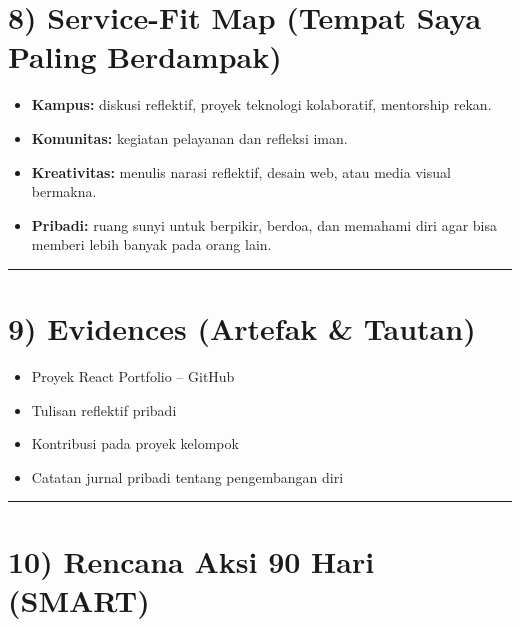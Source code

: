 \documentclass[
  letterpaper,
  DIV=11,
  numbers=noendperiod]{scrreprt}
\providecommand{\tightlist}{%
  \setlength{\itemsep}{0pt}\setlength{\parskip}{0pt}}
\begin{document}
\section{8) Service-Fit Map (Tempat Saya Paling
Berdampak)}\label{service-fit-map-tempat-saya-paling-berdampak}

\begin{itemize}
\tightlist
\item
  \textbf{Kampus:} diskusi reflektif, proyek teknologi kolaboratif,
  mentorship rekan.\\
\item
  \textbf{Komunitas:} kegiatan pelayanan dan refleksi iman.\\
\item
  \textbf{Kreativitas:} menulis narasi reflektif, desain web, atau media
  visual bermakna.\\
\item
  \textbf{Pribadi:} ruang sunyi untuk berpikir, berdoa, dan memahami
  diri agar bisa memberi lebih banyak pada orang lain.
\end{itemize}

\begin{center}\rule{0.5\linewidth}{0.5pt}\end{center}

\section{9) Evidences (Artefak \&
Tautan)}\label{evidences-artefak-tautan}

\begin{itemize}
\tightlist
\item[$\square$]
  Proyek React Portfolio -- GitHub\\
\item[$\square$]
  Tulisan reflektif pribadi\\
\item[$\square$]
  Kontribusi pada proyek kelompok\\
\item[$\square$]
  Catatan jurnal pribadi tentang pengembangan diri
\end{itemize}

\begin{center}\rule{0.5\linewidth}{0.5pt}\end{center}

\section{10) Rencana Aksi 90 Hari
(SMART)}\label{rencana-aksi-90-hari-smart}
\end{document}
